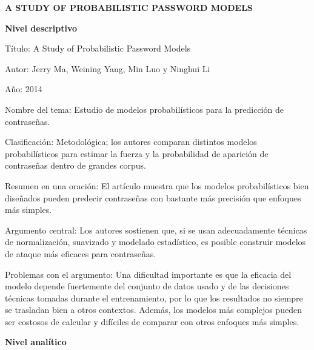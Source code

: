 \documentclass[12pt, letterpaper]{article}
\begin{document}
\begin{center}
    \vspace{0.8cm}
    {\Large \bfseries A STUDY OF PROBABILISTIC PASSWORD MODELS} \\
    \vspace{0.4cm}
\end{center}

\vspace{1.5cm}

\noindent
\textbf{Nivel descriptivo} \newline

\noindent
Título: A Study of Probabilistic Password Models \newline

\noindent
Autor: Jerry Ma, Weining Yang, Min Luo y Ninghui Li \newline

\noindent
Año: 2014 \newline

\noindent
Nombre del tema: Estudio de modelos probabilísticos para la predicción de contraseñas. \newline

\noindent
Clasificación: Metodológica; los autores comparan distintos modelos probabilísticos para estimar la fuerza y la probabilidad de aparición de contraseñas dentro de grandes corpus.\newline

\noindent
Resumen en una oración: El artículo muestra que los modelos probabilísticos bien diseñados pueden predecir contraseñas con bastante más precisión que enfoques más simples. \newline

\noindent
Argumento central: Los autores sostienen que, si se usan adecuadamente técnicas de normalización, suavizado y modelado estadístico, es posible construir modelos de ataque más eficaces para contraseñas.\newline

\noindent
Problemas con el argumento: Una dificultad importante es que la eficacia del modelo depende fuertemente del conjunto de datos usado y de las decisiones técnicas tomadas durante el entrenamiento, por lo que los resultados no siempre se trasladan bien a otros contextos. Además, los modelos más complejos pueden ser costosos de calcular y difíciles de comparar con otros enfoques más simples.
\newpage 

\noindent
\textbf{Nivel analítico} \newline
\end{document}
